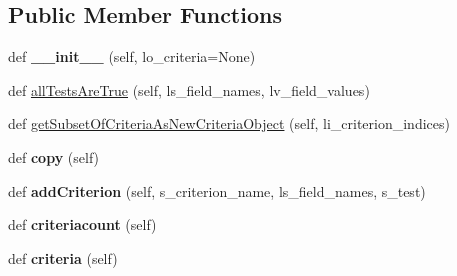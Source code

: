 \subsection*{Public Member Functions}
\begin{DoxyCompactItemize}
\item 
def {\bfseries \+\_\+\+\_\+init\+\_\+\+\_\+} (self, lo\+\_\+criteria=None)\hypertarget{classnegui_1_1genepopindividualid_1_1GenepopIndivCriteria_af2dee1c4395c3be5eb236bb838d79b48}{}\label{classnegui_1_1genepopindividualid_1_1GenepopIndivCriteria_af2dee1c4395c3be5eb236bb838d79b48}

\item 
def \hyperlink{classnegui_1_1genepopindividualid_1_1GenepopIndivCriteria_a8b5b08b5100a7aaa759c26489b87eb34}{all\+Tests\+Are\+True} (self, ls\+\_\+field\+\_\+names, lv\+\_\+field\+\_\+values)
\item 
def \hyperlink{classnegui_1_1genepopindividualid_1_1GenepopIndivCriteria_a30cfe91fa9b4cb481ecf5cab3332ac56}{get\+Subset\+Of\+Criteria\+As\+New\+Criteria\+Object} (self, li\+\_\+criterion\+\_\+indices)
\item 
def {\bfseries copy} (self)\hypertarget{classnegui_1_1genepopindividualid_1_1GenepopIndivCriteria_adb2e780d64d41939ea2918cca0434457}{}\label{classnegui_1_1genepopindividualid_1_1GenepopIndivCriteria_adb2e780d64d41939ea2918cca0434457}

\item 
def {\bfseries add\+Criterion} (self, s\+\_\+criterion\+\_\+name, ls\+\_\+field\+\_\+names, s\+\_\+test)\hypertarget{classnegui_1_1genepopindividualid_1_1GenepopIndivCriteria_a871c920cf188bf93e6b3a30e26afb1a2}{}\label{classnegui_1_1genepopindividualid_1_1GenepopIndivCriteria_a871c920cf188bf93e6b3a30e26afb1a2}

\item 
def {\bfseries criteriacount} (self)\hypertarget{classnegui_1_1genepopindividualid_1_1GenepopIndivCriteria_a20f68e2cf59a14286d038fae4c3547df}{}\label{classnegui_1_1genepopindividualid_1_1GenepopIndivCriteria_a20f68e2cf59a14286d038fae4c3547df}

\item 
def {\bfseries criteria} (self)\hypertarget{classnegui_1_1genepopindividualid_1_1GenepopIndivCriteria_af0b41598685d0acf1607b2d1a80d46c7}{}\label{classnegui_1_1genepopindividualid_1_1GenepopIndivCriteria_af0b41598685d0acf1607b2d1a80d46c7}

\end{DoxyCompactItemize}


